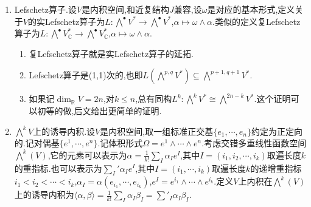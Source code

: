 \begin{enumerate}
\begin{enumerate}[(1)]
\begin{proof}
        	因为$V^{1,0}$中的向量总可以表示为$v-iJ(v),v\in V$,而$V^{0,1}$中的向量总可以表示为$w+iJ(w),w\in V$.并且有$\langle v-iJ(w),w+iJ(w)\rangle_{\mathbb{C}}=0$.
        \end{proof}
        \item 设内积空间$V$和近复结构$J$兼容.在典范同构$(V,J)\cong(V^{1,0},i)$下(这个典范同构是$v\mapsto\frac{1}{2}(v-iJ(v))$),我们有$\frac{1}{2}(-,-)=\langle-,-\rangle_{\mathbb{C}}\mid_{V^{1,0}}$.
        \begin{proof}
        	\begin{align*}
        		&\langle v-iJ(v),w-iJ(w)\rangle_{\mathbb{C}}\\
        		=&\langle v,w\rangle+i\langle v,J(w)\rangle-i\langle J(v),w\rangle+\langle J(v),J(w)\rangle\\
        		=&2\langle v,w\rangle+2i\langle v,J(w)\rangle=2(v,w)
        	\end{align*}
        \end{proof}
        \item 设$z_1,\cdots,z_n$是$V^{1,0}$的一组复基,记$z_k=\frac{1}{2}(x_k-iJ(x_k))$,其中$x_k\in V$,记$y_k=J(x_k)$,那么$\{x_k,y_k,1\le k\le n\}$构成了$V$的一组实基,并且$\{x_k,1\le k\le n\}$构成了$(V,J)$的一组复基.把$V^{1,0}$上的Hermitian形式$\langle-,-\rangle_{\mathbb{C}}$关于基$\{z_k,1\le k\le n\}$的矩阵记作$\frac{1}{2}\left(h_{st}\right)$,换句话讲$\langle z_s,z_t\rangle=\frac{1}{2}h_{st}$,结合上一条得到$(x_s,x_t)=h_{st}$.进而按照$(-,-)$是$(V,J)$上的Hermitian内积,就得到$(x_s,y_t)=-ih_{st}$和$(y_s,y_t)=h_{st}$.
    \end{enumerate}
    \item Lefschetz算子.设$V$是内积空间,和近复结构$J$兼容,设$\omega$是对应的基本形式,定义关于$V$的实Lefschetz算子为$L:\bigwedge^{\bullet}V^*\to\bigwedge^{\bullet}V^*$,$\alpha\mapsto\omega\wedge\alpha$.类似的定义复Lefschetz算子为$L:\bigwedge^{\bullet}V_{\mathbb{C}}^*\to\bigwedge^{\bullet}V_{\mathbb{C}}^*$,$\alpha\mapsto\omega\wedge\alpha$.
    \begin{enumerate}[(1)]
    	\item 复Lefschetz算子就是实Lefschetz算子的延拓.
    	\item Lefschetz算子是(1,1)次的,也即$L\left(\bigwedge^{p,q}V^*\right)\subseteq\bigwedge^{p+1,q+1}V^*$.
    	\item 如果记$\dim_{\mathbb{R}}V=2n$,对$k\le n$,总有同构$L^k:\bigwedge^kV^*\cong\bigwedge^{2n-k}V^*$.这个证明可以初等的做,后文给出更简单的证明.
    \end{enumerate}
    \item $\bigwedge^kV$上的诱导内积.设$V$是内积空间,取一组标准正交基$\{e_1,\cdots,e_n\}$约定为正定向的.记对偶基$\{e^1,\cdots,e^n\}$.记体积形式$\Omega=e^1\wedge\cdots\wedge e^n$.考虑交错多重线性函数空间$\bigwedge^k(V)$,它的元素可以表示为$\alpha=\frac{1}{k!}\sum_I\alpha_Ie^I$,其中$I=(i_1,i_2,\cdots,i_k)$取遍长度$k$的重指标.也可以表示为$\sum_I'\alpha_Ie^I$,其中$I=(i_1,\cdots,i_k)$取遍长度$k$的递增重指标$i_1<i_2<\cdots<i_k$,$\alpha_I=\alpha(e_{i_1},\cdots,e_{i_k})$,$e^I=e^{i_1}\wedge\cdots\wedge e^{i_k}$.定义$V$上内积在$\bigwedge^k(V)$上的诱导内积为$\langle\alpha,\beta\rangle=\frac{1}{k!}\sum_I\alpha_I\beta_I=\sum'_I\alpha_I\beta_I$.

\end{enumerate}

